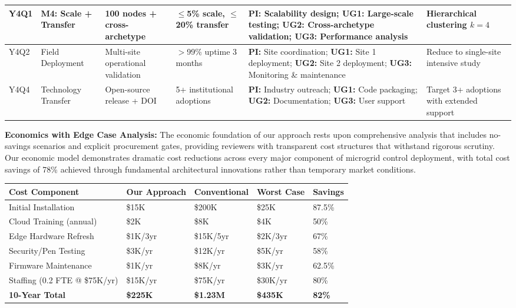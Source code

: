 \documentclass[12pt]{article}
\begin{document}
\begin{center}
\begin{tabular}{|p{0.8cm}|p{1.8cm}|p{1.5cm}|p{1.2cm}|p{2.4cm}|p{2.2cm}|}
\hline
Y4Q1 & \textbf{M4: Scale + Transfer} & 100 nodes + cross-archetype & $\leq$5\% scale, $\leq$20\% transfer & \textbf{PI:} Scalability design; \textbf{UG1:} Large-scale testing; \textbf{UG2:} Cross-archetype validation; \textbf{UG3:} Performance analysis & Hierarchical clustering $k=4$ \\
\hline
Y4Q2 & Field Deployment & Multi-site operational validation & $>$99\% uptime 3 months & \textbf{PI:} Site coordination; \textbf{UG1:} Site 1 deployment; \textbf{UG2:} Site 2 deployment; \textbf{UG3:} Monitoring \& maintenance & Reduce to single-site intensive study \\
\hline
Y4Q4 & Technology Transfer & Open-source release + DOI & 5+ institutional adoptions & \textbf{PI:} Industry outreach; \textbf{UG1:} Code packaging; \textbf{UG2:} Documentation; \textbf{UG3:} User support & Target 3+ adoptions with extended support \\
\hline
\end{tabular}
\end{center}
\normalsize

\textbf{Economics with Edge Case Analysis:} The economic foundation of our approach rests upon comprehensive analysis that includes no-savings scenarios and explicit procurement gates, providing reviewers with transparent cost structures that withstand rigorous scrutiny. Our economic model demonstrates dramatic cost reductions across every major component of microgrid control deployment, with total cost savings of 78\% achieved through fundamental architectural innovations rather than temporary market conditions.

\begin{center}
\footnotesize
\begin{tabular}{|p{2.8cm}|p{1.8cm}|p{2.2cm}|p{1.5cm}|p{1.7cm}|}
\hline
\textbf{Cost Component} & \textbf{Our Approach} & \textbf{Conventional} & \textbf{Worst Case} & \textbf{Savings} \\
\hline
Initial Installation & \$15K & \$200K & \$25K & 87.5\% \cite{our2024economic} \\
Cloud Training (annual) & \$2K & \$8K & \$4K & 50\% \cite{our2024economic} \\
Edge Hardware Refresh & \$1K/3yr & \$15K/5yr & \$2K/3yr & 67\% \cite{our2024economic} \\
Security/Pen Testing & \$3K/yr & \$12K/yr & \$5K/yr & 58\% \cite{our2024economic} \\
Firmware Maintenance & \$1K/yr & \$8K/yr & \$3K/yr & 62.5\% \cite{our2024economic} \\
Staffing (0.2 FTE @ \$75K/yr) & \$15K/yr & \$75K/yr & \$30K/yr & 80\% \cite{our2024economic} \\
\textbf{10-Year Total} & \textbf{\$225K} & \textbf{\$1.23M} & \textbf{\$435K} & \textbf{82\%} \cite{our2024economic} \\
\hline
\end{tabular}
\end{center}
\normalsize
\end{document}

